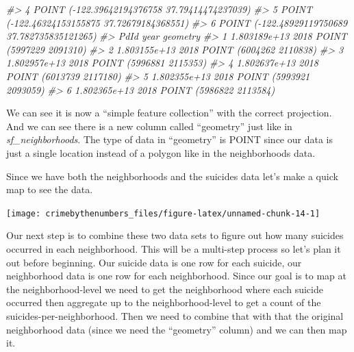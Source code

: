 \documentclass[
  12pt,
  openany]{book}
\newenvironment{Shaded}{\begin{snugshade}}{\end{snugshade}}
\newcommand{\AttributeTok}[1]{\textcolor[rgb]{0.61,0.61,0.61}{#1}}
\newcommand{\CommentTok}[1]{\textcolor[rgb]{0.37,0.37,0.37}{\textit{#1}}}
\newcommand{\ConstantTok}[1]{\textcolor[rgb]{0,0,0}{#1}}
\newcommand{\FunctionTok}[1]{\textcolor[rgb]{0,0,0}{#1}}
\newcommand{\NormalTok}[1]{#1}
\newcommand{\SpecialCharTok}[1]{\textcolor[rgb]{0,0,0}{#1}}
\newcommand{\StringTok}[1]{\textcolor[rgb]{0.5,0.5,0.5}{#1}}
\begin{document}
\begin{Shaded}
\begin{Highlighting}[]
\CommentTok{\#\textgreater{} 4  POINT ({-}122.39642194376758 37.79414474237039)}
\CommentTok{\#\textgreater{} 5  POINT ({-}122.46324153155875 37.72679184368551)}
\CommentTok{\#\textgreater{} 6 POINT ({-}122.48929119750689 37.782735835121265)}
\CommentTok{\#\textgreater{}           PdId year                geometry}
\CommentTok{\#\textgreater{} 1 1.803189e+13 2018 POINT (5997229 2091310)}
\CommentTok{\#\textgreater{} 2 1.803155e+13 2018 POINT (6004262 2110838)}
\CommentTok{\#\textgreater{} 3 1.802957e+13 2018 POINT (5996881 2115353)}
\CommentTok{\#\textgreater{} 4 1.802637e+13 2018 POINT (6013739 2117180)}
\CommentTok{\#\textgreater{} 5 1.802355e+13 2018 POINT (5993921 2093059)}
\CommentTok{\#\textgreater{} 6 1.802365e+13 2018 POINT (5986822 2113584)}
\end{Highlighting}
\end{Shaded}

We can see it is now a ``simple feature collection'' with the correct projection. And we can see there is a new column called ``geometry'' just like in \emph{sf\_neighborhoods}. The type of data in ``geometry'' is POINT since our data is just a single location instead of a polygon like in the neighborhoods data.

Since we have both the neighborhoods and the suicides data let's make a quick map to see the data.

\begin{Shaded}
\end{Shaded}

\begin{center}\texttt{[image: crimebythenumbers\_files/figure-latex/unnamed-chunk-14-1]} \end{center}

Our next step is to combine these two data sets to figure out how many suicides occurred in each neighborhood. This will be a multi-step process so let's plan it out before beginning. Our suicide data is one row for each suicide, our neighborhood data is one row for each neighborhood. Since our goal is to map at the neighborhood-level we need to get the neighborhood where each suicide occurred then aggregate up to the neighborhood-level to get a count of the suicides-per-neighborhood. Then we need to combine that with that the original neighborhood data (since we need the ``geometry'' column) and we can then map it.
\end{document}
